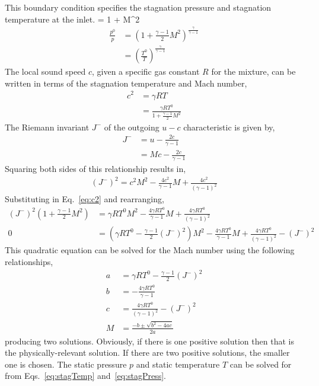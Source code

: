 This boundary condition specifies the stagnation pressure and stagnation temperature at the inlet.
\be\label{eq:stagTemp}
	 = 1 +  M^2
\ee
\begin{align}\label{eq:stagPress}
	\frac{p^0}{p} &= \left( 1 + \frac{\gamma - 1}{2} M^2 \right)^{\frac{\gamma}{\gamma - 1}} \\
	&= \left( \frac{T^0}{T} \right)^{\frac{\gamma}{\gamma - 1}}
\end{align}
The local sound speed $c$, given a specific gas constant $R$ for the mixture, can be written in terms of the stagnation temperature and Mach number,
\begin{align}\label{eq:c2}
	c^2 &= \gamma R T \\
	&= \frac{\gamma R T^0}{1 + \frac{\gamma - 1}{2} M^2}
\end{align}
The Riemann invariant $J^-$ of the outgoing $u-c$ characteristic is given by,
\begin{align}
	J^- &= u - \frac{2 c}{\gamma - 1} \\
	&= M c - \frac{2 c}{\gamma - 1}
\end{align}
Squaring both sides of this relationship results in,
\begin{align}
	(J^-)^2 = c^2 M^2 - \frac{4 c^2}{\gamma - 1} M + \frac{4 c^2}{(\gamma - 1)^2}
\end{align}
Substituting in Eq.~\ref{eq:c2} and rearranging, 
\begin{align}\label{eq:machQuad}
	(J^-)^2 \left(1 + \frac{\gamma - 1}{2} M^2 \right) &= \gamma R T^0 M^2 - \frac{4 \gamma R T^0}{\gamma - 1} M + \frac{4 \gamma R T^0}{(\gamma - 1)^2} \\ 
	0 &= \left(\gamma R T^0 - \frac{\gamma - 1}{2}(J^-)^2 \right) M^2 - \frac{4\gamma R T^0}{\gamma - 1} M + \frac{4\gamma R T^0}{(\gamma - 1)^2} - (J^-)^2
\end{align}
This quadratic equation can be solved for the Mach number using the following relationships,
\begin{align}
	a &= \gamma R T^0 - \frac{\gamma - 1}{2}(J^-)^2 \\
	b &= -\frac{4\gamma R T^0}{\gamma - 1} \\
	c &= \frac{4\gamma R T^0}{(\gamma - 1)^2} - (J^-)^2 \\
	M &= \frac{-b \pm \sqrt{b^2 - 4ac}}{2a}
\end{align}
producing two solutions. Obviously, if there is one positive solution then that is the physically-relevant solution. If there are two positive solutions, the smaller one is chosen. The static pressure $p$ and static temperature $T$ can be solved for from Eqs.~\ref{eq:stagTemp} and~\ref{eq:stagPress}.

